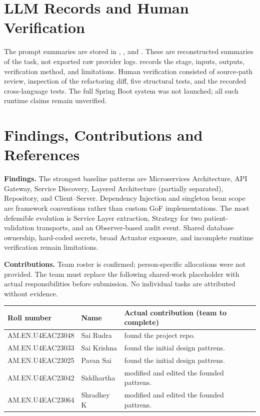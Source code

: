 \documentclass[11pt,a4paper]{article}
\begin{document}
\section{LLM Records and Human Verification}
The prompt summaries are stored in , , and . These are reconstructed summaries of the task, not exported raw provider logs.  records the stage, inputs, outputs, verification method, and limitations. Human verification consisted of source-path review, inspection of the refactoring diff, five structural tests, and the recorded cross-language tests. The full Spring Boot system was not launched; all such runtime claims remain unverified.

\section{Findings, Contributions and References}
\textbf{Findings.} The strongest baseline patterns are Microservices Architecture, API Gateway, Service Discovery, Layered Architecture (partially separated), Repository, and Client--Server. Dependency Injection and singleton bean scope are framework conventions rather than custom GoF implementations. The most defensible evolution is Service Layer extraction, Strategy for two patient-validation transports, and an Observer-based audit event. Shared database ownership, hard-coded secrets, broad Actuator exposure, and incomplete runtime verification remain limitations.

\textbf{Contributions.} Team roster is confirmed; person-specific allocations were not provided. The team must replace the following shared-work placeholder with actual responsibilities before submission. No individual tasks are attributed without evidence.
\begin{tabularx}{\linewidth}{@{}p{1.7in}p{1.5in}Y@{}}
\toprule\textbf{Roll number} & \textbf{Name} & \textbf{Actual contribution (team to complete)}\\\midrule
AM.EN.U4EAC23048 & Sai Rudra & found the project repo.\\
AM.EN.U4EAC23033 & Sai Krishna & found the initial design pattrens.\\
AM.EN.U4EAC23025 & Pavan Sai & found the initial design pattrens.\\
AM.EN.U4EAC23042 & Siddhartha & modified and edited the founded pattrens.\\
AM.EN.U4EAC23064 & Shradhey K & modified and edited the founded pattrens.\\
\bottomrule
\end{tabularx}
\end{document}
